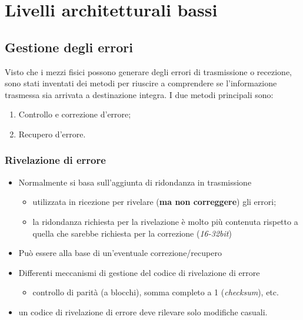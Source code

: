 \documentclass{book}
\begin{document}

\chapter{Livelli architetturali bassi}

\section{Gestione degli errori}
Visto che i mezzi fisici possono generare degli errori di trasmissione o
recezione, sono stati inventati dei metodi per riuscire a comprendere se
l'informazione trasmessa sia arrivata a destinazione integra. I due metodi
principali sono:
\begin{enumerate}
	\item Controllo e correzione d'errore;
	\item Recupero d'errore.
\end{enumerate}
\subsection{Rivelazione di errore}
\begin{itemize}
	\item Normalmente si basa sull'aggiunta di ridondanza in trasmissione
		\begin{itemize}
			\item utilizzata in ricezione per rivelare ({\bf ma non correggere})
				gli errori;
			\item la ridondanza richiesta per la rivelazione è molto più
				contenuta rispetto a quella che sarebbe richiesta per la
				correzione (\textit{16-32bit})
		\end{itemize}
	\item Può essere alla base di un'eventuale correzione/recupero
	\item Differenti meccanismi di gestione del codice di rivelazione di errore
		\begin{itemize}
			\item controllo di parità (a blocchi), somma completo a 1
				(\textit{checksum}), etc.
		\end{itemize}
	\item un codice di rivelazione di errore deve rilevare solo modifiche
		casuali.
\end{itemize}
\end{document}
